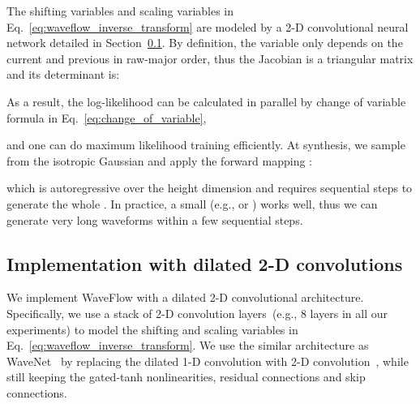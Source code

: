 \documentclass{article}
\begin{document}
The shifting variables  and scaling variables  in Eq.~\eqref{eq:waveflow_inverse_transform} are modeled by a 2-D convolutional neural network detailed in Section~\ref{subsec:conv2d}.
By definition, the variable  only depends on the current  and previous  in raw-major order, thus the Jacobian is a triangular matrix and its determinant is:

As a result, the log-likelihood can be calculated in parallel by change of variable formula in  Eq.~\eqref{eq:change_of_variable},

and one can do maximum likelihood training efficiently.
At synthesis, we sample  from the isotropic Gaussian and apply the forward mapping :

which is autoregressive over the height dimension and requires  sequential steps to generate the whole . In practice, a small  (e.g.,  or ) works well, thus we can generate very long waveforms within a few sequential steps.



\vspace{-.2em}
\subsection{Implementation with dilated 2-D convolutions}
\label{subsec:conv2d}
\vspace{-.1em}
We implement WaveFlow with a dilated 2-D convolutional architecture.
Specifically, we use a stack of 2-D convolution layers~(e.g., 8 layers in all our experiments) to model the shifting  and scaling variables  in Eq.~\eqref{eq:waveflow_inverse_transform}. 
We use the similar architecture as WaveNet~\citep{oord2016wavenet} by replacing the dilated 1-D convolution with 2-D convolution~\citep{yu2015multi}, while still keeping the gated-tanh nonlinearities, residual connections and skip connections.
\end{document}
